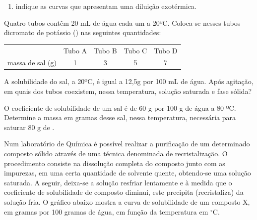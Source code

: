 \documentclass[a4paper,12]{exam}
\begin{document}
\begin{multicols}{2}
\begin{questions}
\begin{enumerate}[label=\alph*)]
				\item indique as curvas que apresentam uma diluição exotérmica.
				\fillwithlines{8em}
				
			\end{enumerate}
	
	
		\question Quatro tubos contêm 20 mL de água cada um a 20ºC. Coloca-se nesses tubos dicromato de potássio () nas seguintes quantidades:
		
		\begin{tabular}{ccccc}
                       & Tubo A & Tubo B & Tubo C & Tubo D \\
massa de sal (g) & 1      & 3      & 5      & 7     
		\end{tabular}

A solubilidade do sal, a 20ºC, é igual a 12,5g por 100 mL de água. Após agitação, em quais dos tubos coexistem, nessa temperatura, solução saturada e fase sólida? \makeemptybox{2cm}

		\question O coeficiente de solubilidade de um sal é
de 60 g por 100 g de água a 80 ºC.
Determine a massa em gramas desse sal,
nessa temperatura, necessária para saturar
80 g de .\makeemptybox{2cm}

		\question Num laboratório de Química é possível realizar a purificação de um determinado composto sólido através de uma técnica denominada de recristalização. O procedimento consiste na dissolução completa do composto junto com as impurezas, em uma certa quantidade de solvente quente, obtendo-se uma solução saturada. A seguir, deixa-se a solução resfriar lentamente e à medida que o coeficiente de solubilidade de composto diminui, este precipita (recristaliza) da solução fria. O gráfico abaixo mostra a curva de solubilidade de um composto X, em gramas por 100 gramas de água, em função da temperatura em $^{\circ}$C.


\end{questions}
\end{multicols}
\end{document}
